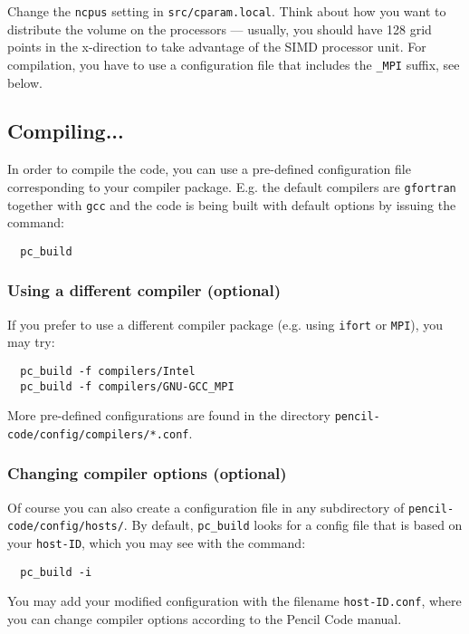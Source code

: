 \documentclass[a4paper,12pt]{article}
\begin{document}
Change the \verb|ncpus| setting in \verb|src/cparam.local|.
Think about how you want to distribute the volume on the processors --- usually, you should have 128 grid points in the x-direction to take advantage of the SIMD processor unit.
For compilation, you have to use a configuration file that includes the \verb|_MPI| suffix, see below.

\subsection{Compiling...}

In order to compile the code, you can use a pre-defined configuration file corresponding to your compiler package.
E.g. the default compilers are \verb|gfortran| together with \verb|gcc| and the code is being built with default options by issuing the command:

\begin{verbatim}
  pc_build
\end{verbatim}

\subsubsection{Using a different compiler (optional)}

If you prefer to use a different compiler package (e.g. using \verb|ifort| or \verb|MPI|), you may try:

\begin{verbatim}
  pc_build -f compilers/Intel
  pc_build -f compilers/GNU-GCC_MPI
\end{verbatim}

More pre-defined configurations are found in the directory \verb|pencil-code/config/compilers/*.conf|.

\subsubsection{Changing compiler options (optional)}

Of course you can also create a configuration file in any subdirectory of \verb|pencil-code/config/hosts/|.
By default, \verb|pc_build| looks for a config file that is based on your \verb|host-ID|, which you may see with the command:
\begin{verbatim}
  pc_build -i
\end{verbatim}
You may add your modified configuration with the filename \verb|host-ID.conf|, where you can change compiler options according to the Pencil Code manual.
\end{document}

